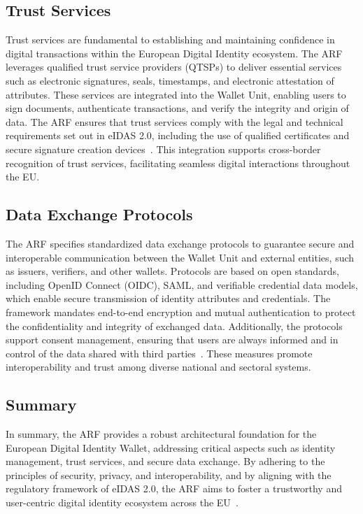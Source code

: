 \documentclass[sigconf,balance,nonacm,authordraft]{acmart}
\begin{document}
\subsection{Trust Services}
Trust services are fundamental to establishing and maintaining confidence in digital transactions within the European Digital Identity ecosystem. The ARF leverages qualified trust service providers (QTSPs) to deliver essential services such as electronic signatures, seals, timestamps, and electronic attestation of attributes. These services are integrated into the Wallet Unit, enabling users to sign documents, authenticate transactions, and verify the integrity and origin of data. The ARF ensures that trust services comply with the legal and technical requirements set out in eIDAS 2.0, including the use of qualified certificates and secure signature creation devices~\cite{EU_ARF2024,EU_eIDAS2024}. This integration supports cross-border recognition of trust services, facilitating seamless digital interactions throughout the EU.

\subsection{Data Exchange Protocols}
The ARF specifies standardized data exchange protocols to guarantee secure and interoperable communication between the Wallet Unit and external entities, such as issuers, verifiers, and other wallets. Protocols are based on open standards, including OpenID Connect (OIDC), SAML, and verifiable credential data models, which enable secure transmission of identity attributes and credentials. The framework mandates end-to-end encryption and mutual authentication to protect the confidentiality and integrity of exchanged data. Additionally, the protocols support consent management, ensuring that users are always informed and in control of the data shared with third parties~\cite{EU_ARF2024}. These measures promote interoperability and trust among diverse national and sectoral systems.

\subsection{Summary}
In summary, the ARF provides a robust architectural foundation for the European Digital Identity Wallet, addressing critical aspects such as identity management, trust services, and secure data exchange. By adhering to the principles of security, privacy, and interoperability, and by aligning with the regulatory framework of eIDAS 2.0, the ARF aims to foster a trustworthy and user-centric digital identity ecosystem across the EU~\cite{EU_ARF2024,EU_eIDAS2024}.
\end{document}
